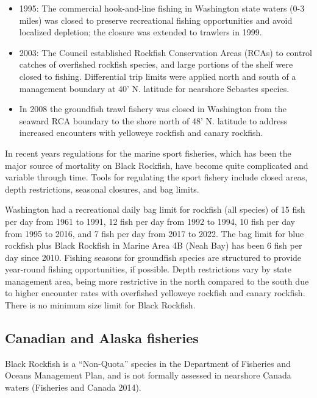 \documentclass[11pt,
  english,
  letterpaper,
]{article}
\providecommand{\tightlist}{%
  \setlength{\itemsep}{0pt}\setlength{\parskip}{0pt}}
\providecommand{\tightlist}{%
  \setlength{\itemsep}{0pt}\setlength{\parskip}{0pt}}
\begin{document}
\begin{itemize}
\tightlist
\item
  1995: The commercial hook-and-line fishing in Washington state waters (0-3 miles) was closed to preserve recreational fishing opportunities and avoid localized depletion; the closure was extended to trawlers in 1999.\\
\item
  2003: The Council established Rockfish Conservation Areas (RCAs) to control catches of overfished rockfish species, and large portions of the shelf were closed to fishing. Differential trip limits were applied north and south of a management boundary at 40' N. latitude for nearshore Sebastes species.
\item
  In 2008 the groundfish trawl fishery was closed in Washington from the seaward RCA boundary to the shore north of 48' N. latitude to address increased encounters with yelloweye rockfish and canary rockfish.
\end{itemize}

In recent years regulations for the marine sport fisheries, which has been the major source of mortality on Black Rockfish, have become quite complicated and variable through time. Tools for regulating the sport fishery include closed areas, depth restrictions, seasonal closures, and bag limits.

Washington had a recreational daily bag limit for rockfish (all species) of 15 fish per day from 1961 to 1991, 12 fish per day from 1992 to 1994, 10 fish per day from 1995 to 2016, and 7 fish per day from 2017 to 2022. The bag limit for blue rockfish plus Black Rockfish in Marine Area 4B (Neah Bay) has been 6 fish per day since 2010. Fishing seasons for groundfish species are structured to provide year-round fishing opportunities, if possible. Depth restrictions vary by state management area, being more restrictive in the north compared to the south due to higher encounter rates with overfished yelloweye rockfish and canary rockfish. There is no minimum size limit for Black Rockfish.

\hypertarget{canadian-and-alaska-fisheries}{%
\subsection{Canadian and Alaska fisheries}\label{canadian-and-alaska-fisheries}}

Black Rockfish is a ``Non-Quota'' species in the Department of Fisheries and Oceans Management Plan, and is not formally assessed in nearshore Canada waters (Fisheries and Canada 2014).
\end{document}
